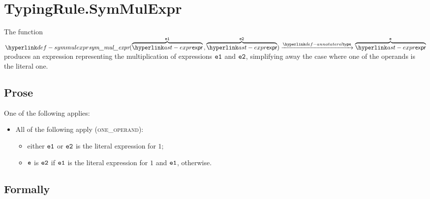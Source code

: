 \begin{mathpar}
\end{mathpar}

\section{TypingRule.SymMulExpr \label{sec:TypingRule.SymMulExpr}}
\hypertarget{def-symmulexpr}{}
The function
$
\symmulexpr(\overname{\expr}{\veone} \aslsep \overname{\expr}{\vetwo}) \typearrow \overname{\expr}{\ve}
$
produces an expression representing the multiplication of expressions $\veone$ and $\vetwo$,
simplifying away the case where one of the operands is the literal one.

\subsection{Prose}
One of the following applies:
\begin{itemize}
  \item All of the following apply (\textsc{one\_operand}):
  \begin{itemize}
    \item either $\veone$ or $\vetwo$ is the literal expression for $1$;
    \item $\ve$ is $\vetwo$ if $\veone$ is the literal expression for $1$ and $\veone$, otherwise.
  \end{itemize}
\end{itemize}

\subsection{Formally}

